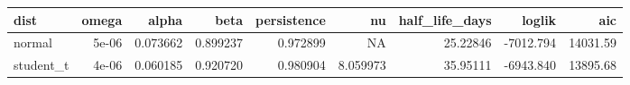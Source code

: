 
\begin{tabular}{lrrrrrrrr}
\toprule
dist & omega & alpha & beta & persistence & nu & half\_life\_days & loglik & aic\\
\midrule
normal & 5e-06 & 0.073662 & 0.899237 & 0.972899 & NA & 25.22846 & -7012.794 & 14031.59\\
student\_t & 4e-06 & 0.060185 & 0.920720 & 0.980904 & 8.059973 & 35.95111 & -6943.840 & 13895.68\\
\bottomrule
\end{tabular}
